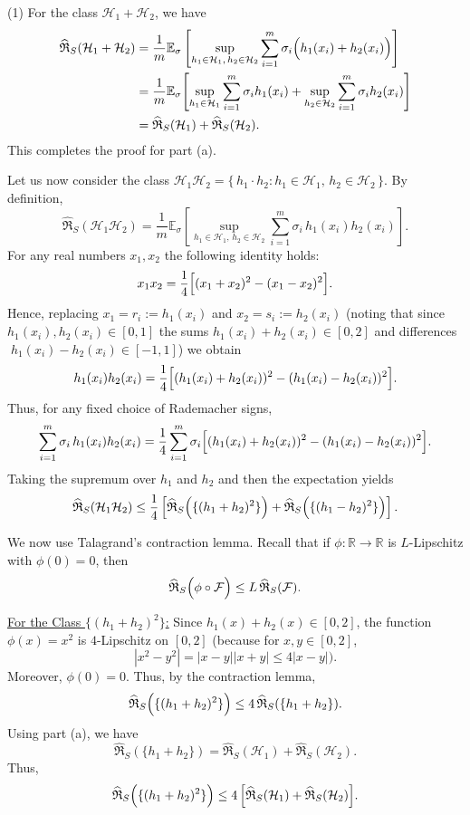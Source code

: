 \documentclass[letterpaper, 11pt]{article}
\newcommand{\1}{\mathds{1}}	%
\theoremstyle{definition}
\begin{document}
(1)
For the class \(\mathcal{H}_1+\mathcal{H}_2\), we have
\[
\begin{aligned}
\widehat{\mathfrak{R}}_S(\mathcal{H}_1+\mathcal{H}_2) 
&=\frac{1}{m}\mathbb{E}_\sigma \left[\sup_{h_1\in\mathcal{H}_1,\,h_2\in\mathcal{H}_2} \sum_{i=1}^m \sigma_i \Bigl(h_1(x_i)+h_2(x_i)\Bigr)\right] \\
&=\frac{1}{m}\mathbb{E}_\sigma \Biggl[
\sup_{h_1\in\mathcal{H}_1}\sum_{i=1}^m \sigma_i h_1(x_i)
+\sup_{h_2\in\mathcal{H}_2}\sum_{i=1}^m \sigma_i h_2(x_i)
\Biggr] \\
&=\widehat{\mathfrak{R}}_S(\mathcal{H}_1)+\widehat{\mathfrak{R}}_S(\mathcal{H}_2).
\end{aligned}
\]
 This completes the proof for part (a).

Let us now consider the class \(\mathcal{H}_1\mathcal{H}_2=\{\,h_1\cdot h_2: h_1\in\mathcal{H}_1,\,h_2\in\mathcal{H}_2\,\}\). By definition,
\[
\widehat{\mathfrak{R}}_S(\mathcal{H}_1\mathcal{H}_2)
=\frac{1}{m}\mathbb{E}_\sigma \left[\sup_{h_1\in\mathcal{H}_1,\, h_2\in\mathcal{H}_2} \sum_{i=1}^m \sigma_i \, h_1(x_i)h_2(x_i)\right].
\]
For any real numbers \(x_1,x_2\) the following identity holds:
\[
x_1x_2=\frac{1}{4}\Bigl[(x_1+x_2)^2-(x_1-x_2)^2\Bigr].
\]
Hence, replacing \(x_1=r_i:=h_1(x_i)\) and \(x_2=s_i:=h_2(x_i)\) (noting that since \(h_1(x_i),h_2(x_i)\in[0,1]\) the sums \(h_1(x_i)+h_2(x_i)\in[0,2]\) and differences \(\;h_1(x_i)-h_2(x_i)\in[-1,1]\)) we obtain
\[
h_1(x_i)h_2(x_i)=\frac{1}{4}\Bigl[(h_1(x_i)+h_2(x_i))^2-(h_1(x_i)-h_2(x_i))^2\Bigr].
\]
Thus, for any fixed choice of Rademacher signs,
\[
\sum_{i=1}^m\sigma_i\, h_1(x_i)h_2(x_i)
=\frac{1}{4}\sum_{i=1}^m\sigma_i\Bigl[(h_1(x_i)+h_2(x_i))^2-(h_1(x_i)-h_2(x_i))^2\Bigr].
\]
Taking the supremum over \(h_1\) and \(h_2\) and then the expectation yields
\[
\widehat{\mathfrak{R}}_S(\mathcal{H}_1\mathcal{H}_2)
\le \frac{1}{4}\left[
\widehat{\mathfrak{R}}_S\Bigl(\{(h_1+h_2)^2\}\Bigr)
+\widehat{\mathfrak{R}}_S\Bigl(\{(h_1-h_2)^2\}\Bigr)
\right].
\]

We now use Talagrand's contraction lemma. Recall that if \(\phi\colon\mathbb{R}\to\mathbb{R}\) is \(L\)-Lipschitz with \(\phi(0)=0\), then
\[
\widehat{\mathfrak{R}}_S\Bigl(\phi\circ\mathcal{F}\Bigr)
\le L\,\widehat{\mathfrak{R}}_S(\mathcal{F}).
\]

\medskip

\underline{For the Class \(\{(h_1+h_2)^2\}\):}  
Since \(h_1(x)+h_2(x)\in[0,2]\), the function \(\phi(x)=x^2\) is \(4\)-Lipschitz on \([0,2]\) (because for \(x,y\in[0,2]\),
\[
|x^2-y^2|=|x-y||x+y|\le 4|x-y|).
\]
Moreover, \(\phi(0)=0\). Thus, by the contraction lemma,
\[
\widehat{\mathfrak{R}}_S\Bigl(\{(h_1+h_2)^2\}\Bigr)
\le 4\,\widehat{\mathfrak{R}}_S(\{h_1+h_2\}).
\]
Using part (a), we have
\[
\widehat{\mathfrak{R}}_S(\{h_1+h_2\})=\widehat{\mathfrak{R}}_S(\mathcal{H}_1)
+\widehat{\mathfrak{R}}_S(\mathcal{H}_2).
\]
Thus,
\[
\widehat{\mathfrak{R}}_S\Bigl(\{(h_1+h_2)^2\}\Bigr)
\le 4\,\Bigl[\widehat{\mathfrak{R}}_S(\mathcal{H}_1)
+\widehat{\mathfrak{R}}_S(\mathcal{H}_2)\Bigr].
\]
\end{document}
